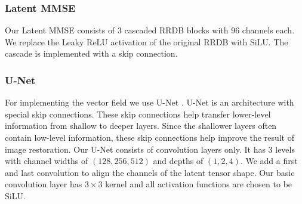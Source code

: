 \subsubsection{Latent MMSE}
Our Latent MMSE consists of 3 cascaded RRDB blocks \cite{wang2018esrgan} with 96 channels each. We replace the Leaky ReLU activation of the original RRDB with SiLU. The cascade is implemented with a skip connection.

\subsubsection{U-Net}
For implementing the vector field we use U-Net \cite{ronneberger2015u}. U-Net is an architecture with special skip connections. These skip connections help transfer lower-level information from shallow to deeper layers. Since the shallower layers often contain low-level information, these skip connections help improve the result of image restoration. Our U-Net consists of convolution layers only. It has 3 levels with channel widths of $(128,256,512)$ and depths of $(1,2,4)$. We add a first and last convolution to align the channels of the latent tensor shape. Our basic convolution layer has $3\times3$ kernel and all activation functions are chosen to be SiLU. 

\newpage
